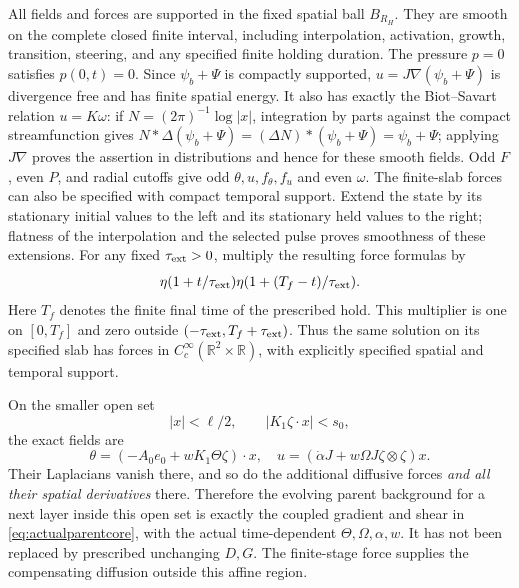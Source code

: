 All fields and forces are supported in the fixed spatial ball
$B_{R_H}$. They are smooth on the complete closed finite interval,
including interpolation, activation, growth, transition, steering,
and any specified finite holding duration. The pressure $p=0$
satisfies $p(0,t)=0$. Since $\psi_b+\Psi$ is compactly supported,
$u=J\nabla(\psi_b+\Psi)$ is divergence free and has finite
spatial energy. It also has exactly the Biot--Savart relation
$u=K\omega$: if $N=(2\pi)^{-1}\log|x|$, integration by parts
against the compact streamfunction gives
$N*\Delta(\psi_b+\Psi)=(\Delta N)*(\psi_b+\Psi)=\psi_b+\Psi$;
applying $J\nabla$ proves the assertion in distributions and hence
for these smooth fields. Odd $F$, even $P$, and radial cutoffs
give odd $\theta,u,f_\theta,f_u$ and even $\omega$.
The finite-slab forces can also be specified with compact temporal
support. Extend the state by its stationary initial values to the
left and its stationary held values to the right; flatness of the
interpolation and the selected pulse proves smoothness of these
extensions. For any fixed $\tau_{\rm ext}>0$, multiply the
resulting force formulas by
\[
 \eta(1+t/\tau_{\rm ext})
 \eta(1+(T_f-t)/\tau_{\rm ext}).
\]
Here $T_f$ denotes the finite final time of the prescribed hold.
This multiplier is one on $[0,T_f]$ and zero outside
$(-\tau_{\rm ext},T_f+\tau_{\rm ext})$. Thus the same solution
on its specified slab has forces in $C_c^\infty(\mathbb R^2\times
\mathbb R)$, with explicitly specified spatial and temporal support.

On the smaller open set
\[
 |x|<\ell/2,\qquad |K_1\zeta\cdot x|<s_0,
\]
the exact fields are
\begin{equation}
 \theta=(-A_0e_0+wK_1\Theta\zeta)\cdot x,
 \quad u=(\dot\alpha J+w\Omega J\zeta\otimes\zeta)x.
 \label{eq:actualparentcore}
\end{equation}
Their Laplacians vanish there, and so do the additional diffusive
forces \emph{and all their spatial derivatives} there. Therefore
the evolving parent background for a next layer inside this open
set is exactly the coupled gradient and shear in
\eqref{eq:actualparentcore}, with the actual time-dependent
$\Theta,\Omega,\alpha,w$. It has not been replaced by prescribed
unchanging $D,G$. The finite-stage force supplies the compensating
diffusion outside this affine region.

